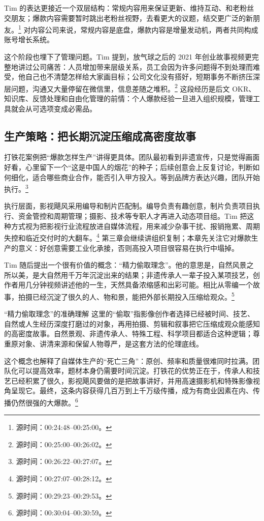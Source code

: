 Tim 的表达更接近一个双层结构：常规内容用来保证更新、维持互动、和老粉丝交朋友；爆款内容需要暂时跳出老粉丝视野，去看更大的议题，结交更广泛的新朋友。\footnote{源时间：00:24:48--00:25:00。} 对内容公司来说，常规内容是底盘，爆款内容是增量发动机，两者共同构成账号增长系统。

这个阶段也埋下了管理问题。Tim 提到，放气球之后的 2021 年创业故事视频更完整地讲过公司痛苦：人员增加带来层级关系，员工会因为许多问题得不到处理而难受，他自己也不清楚怎样给大家画目标；公司文化没有搭好，短期事务不断挤压深层问题，沟通又大量停留在微信里，信息差随之堆积。\footnote{源时间：00:25:00--00:26:02。} 这段经历是后文 OKR、知识库、反馈处理和自由化管理的前情：个人爆款经验一旦进入组织规模，管理工具就会从可选项变成必需品。

\subsection{生产策略：把长期沉淀压缩成高密度故事}

打铁花案例把“爆款怎样生产”讲得更具体。团队最初看到非遗宣传，只是觉得画面好看，心里留下一个“这是中国人的烟花”的种子；后续创意会上反复讨论，判断如何细化，适合哪些商业合作，能否引入甲方投入。等到品牌方表达兴趣，团队开始执行。\footnote{源时间：00:26:22--00:27:07。}

执行层面，影视飓风采用编导和制片匹配制。编导负责有趣创意，制片负责项目执行、资金管控和周期管理；摄影、技术等专职人才再进入动态项目组。Tim 把这种方式视为把影视行业流程放进自媒体流程，用来减少杂事干扰、报销拖累、周期失控和临近交付时的大翻车。\footnote{源时间：00:27:07--00:28:12。} 第三章会继续讲组织复制；本章先关注它对爆款生产的意义：好创意需要工业化承接，否则高投入项目很容易在执行中塌掉。

Tim 随后提出一个很有价值的概念：“精力偷取理念”。他的意思是，自然风景之所以美，是大自然用千万年沉淀出来的结果；非遗传承人一辈子投入某项技艺，创作者用几分钟视频讲述他的一生，天然具备浓缩感和出彩可能。相比从零编一个故事，拍摄已经沉淀了很久的人、物和景，能把外部长期投入压缩给观众。\footnote{源时间：00:29:23--00:29:53。}

\begin{importantbox}{“精力偷取理念”的准确理解}
这里的“偷取”指影像创作者选择已经被时间、技艺、自然或人生经历深度打磨过的对象，再用拍摄、剪辑和叙事把它压缩成观众能感知的高密度故事。自然景观、非遗传承人、特殊工程、科学项目都适合这种逻辑；尊重原对象、讲清来源和保留人物尊严，是这套方法的伦理底线。
\end{importantbox}

这个概念也解释了自媒体生产的“死亡三角”：原创、频率和质量很难同时拉满。团队化可以提高效率，题材本身仍需要时间沉淀。打铁花的优势正在于，传承人和技艺已经积累了很久，影视飓风要做的是把故事讲好，并用高速摄影机和特殊影像视角呈现它。最终，这条内容获得几百万到上千万级传播，成为有商业因素在内、传播仍然很强的大爆款。\footnote{源时间：00:30:04--00:30:59。}

